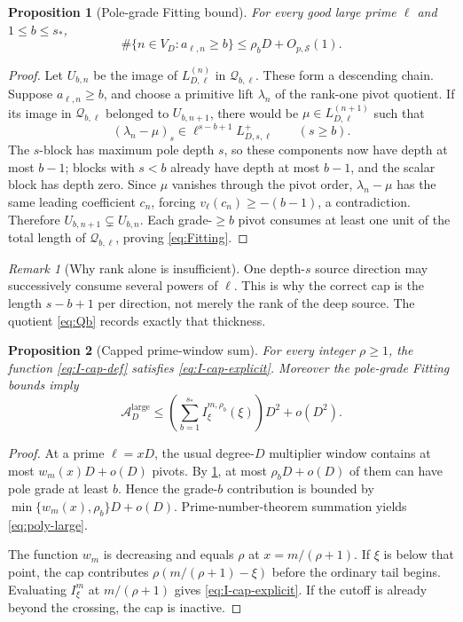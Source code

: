 \documentclass[11pt]{article}
\newtheorem{proposition}[proposition]{Proposition}
\theoremstyle{definition}
\theoremstyle{remark}
\newtheorem{remark}[remark]{Remark}
\begin{document}
\begin{proposition}[Pole-grade Fitting bound]\label{prop:Fitting}
For every good large prime $\ell$ and $1\le b\le s_*$,
\begin{equation}\label{eq:Fitting}
 \#\{n\in V_D:a_{\ell,n}\ge b\}
 \le\rho_bD+O_{p,\mathcal S}(1).
\end{equation}
\end{proposition}

\begin{proof}
Let $U_{b,n}$ be the image of $L_{D,\ell}^{(n)}$ in
$\mathcal Q_{b,\ell}$.  These form a descending chain.  Suppose
$a_{\ell,n}\ge b$, and choose a primitive lift $\lambda_n$ of the rank-one
pivot quotient.  If its image in $\mathcal Q_{b,\ell}$ belonged to
$U_{b,n+1}$, there would be $\mu\in L_{D,\ell}^{(n+1)}$ such that
\[
 (\lambda_n-\mu)_s\in\ell^{s-b+1}L^+_{D,s,\ell}
 \qquad(s\ge b).
\]
The $s$-block has maximum pole depth $s$, so these components now have depth
at most $b-1$; blocks with $s<b$ already have depth at most $b-1$, and the
scalar block has depth zero.  Since $\mu$ vanishes through the pivot order,
$\lambda_n-\mu$ has the same leading coefficient $c_n$, forcing
$v_\ell(c_n)\ge-(b-1)$, a contradiction.  Therefore
$U_{b,n+1}\subsetneq U_{b,n}$.  Each grade-$\ge b$ pivot consumes at least one
unit of the total length of $\mathcal Q_{b,\ell}$, proving
\eqref{eq:Fitting}.
\end{proof}

\begin{remark}[Why rank alone is insufficient]
One depth-$s$ source direction may successively consume several powers of
$\ell$.  This is why the correct cap is the length
$s-b+1$ per direction, not merely the rank of the deep source.  The quotient
\eqref{eq:Qb} records exactly that thickness.
\end{remark}

\begin{proposition}[Capped prime-window sum]\label{prop:capped-window}
For every integer $\rho\ge1$, the function \eqref{eq:I-cap-def} satisfies
\eqref{eq:I-cap-explicit}.  Moreover the pole-grade Fitting bounds imply
\begin{equation}\label{eq:poly-large}
 \mathscr A_D^{\mathrm{large}}
 \le\left(\sum_{b=1}^{s_*}I^{m,\rho_b}_\xi(\xi)\right)D^2+o(D^2).
\end{equation}
\end{proposition}

\begin{proof}
At a prime $\ell=xD$, the usual degree-$D$ multiplier window contains at most
$w_m(x)D+o(D)$ pivots.  By \cref{prop:Fitting}, at most
$\rho_bD+o(D)$ of them can have pole grade at least $b$.  Hence the grade-$b$
contribution is bounded by
$\min\{w_m(x),\rho_b\}D+o(D)$.  Prime-number-theorem summation yields
\eqref{eq:poly-large}.

The function $w_m$ is decreasing and equals $\rho$ at
$x=m/(\rho+1)$.  If $\xi$ is below that point, the cap contributes
$\rho(m/(\rho+1)-\xi)$ before the ordinary tail begins.  Evaluating
$I^m_\xi$ at $m/(\rho+1)$ gives \eqref{eq:I-cap-explicit}.  If the cutoff is
already beyond the crossing, the cap is inactive.
\end{proof}
\end{document}
